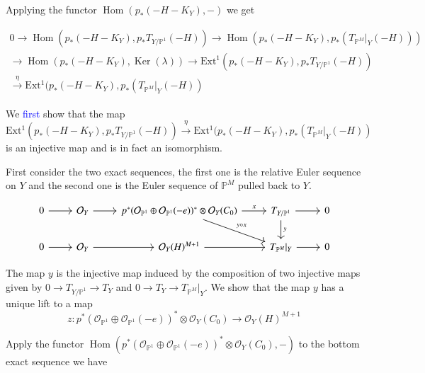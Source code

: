 \documentclass[11pt,twoside]{amsart}
\theoremstyle{plain}
\numberwithin{equation}{section}
\theoremstyle{definition}
\begin{document}
Applying the functor $\operatorname{Hom}(p_*(-H-K_Y),-)$ we get 

\begin{multline}\label{30}
0 \to \operatorname{Hom}(p_*(-H-K_Y), 
 p_*T_{Y/\mathbb{P}^1}(-H))  \to \operatorname{Hom}(p_*(-H-K_Y), p_*(T_{\mathbb{P}^M}|_Y(-H))) \\ \to \operatorname{Hom}(p_*(-H-K_Y),\operatorname{Ker}(\lambda)) \to \operatorname{Ext^1}(p_*(-H-K_Y), 
 p_*T_{Y/\mathbb{P}^1}(-H)) \\ \xrightarrow[]{\eta} \operatorname{Ext^1}(p_*(-H-K_Y), 
 p_*(T_{\mathbb{P}^M}|_Y(-H))
\end{multline}


We \textcolor{blue}{first} show that the map $\operatorname{Ext^1}(p_*(-H-K_Y), 
 p_*T_{Y/\mathbb{P}^1}(-H))  \xrightarrow[]{\eta} \operatorname{Ext^1}(p_*(-H-K_Y), 
 p_*(T_{\mathbb{P}^M}|_Y(-H))$ is an injective map and is in fact an isomorphism. 

\color{blue}

First consider the two exact sequences, the first one is the relative Euler sequence on $Y$ and the second one is the Euler sequence of $\mathbb{P}^M$ pulled back to $Y$.

\[
\begin{tikzcd}
  0 \arrow[r] & \mathcal{O}_Y \arrow[r] & p^*(\mathcal{O}_{\mathbb{P}^1} \oplus \mathcal{O}_{\mathbb{P}^1}(-e))^* \otimes \mathcal{O}_{Y}(C_0) \arrow[r, "x"] \arrow[dr, "y \circ x"] & T_{Y/\mathbb{P}^1} \arrow[r] \arrow[d, "y"] & 0 \\
   0 \arrow[r] & \mathcal{O}_Y \arrow[r] & \mathcal{O}_Y(H)^{M+1} \arrow[r] & T_{\mathbb{P}^M}|_Y \arrow[r] & 0
\end{tikzcd}
\]

The map $y$ is the injective map induced by the composition of two injective maps given by $0 \to T_{Y/\mathbb{P}^1} \to T_Y$ and $0 \to T_Y \to T_{\mathbb{P}^M}|_Y$. We show that the map $y$ has a unique lift to a map $$z: p^*(\mathcal{O}_{\mathbb{P}^1} \oplus \mathcal{O}_{\mathbb{P}^1}(-e))^* \otimes \mathcal{O}_Y(C_0) \to \mathcal{O}_Y(H)^{M+1}$$

Apply the functor $\operatorname{Hom}(p^*(\mathcal{O}_{\mathbb{P}^1} \oplus \mathcal{O}_{\mathbb{P}^1}(-e))^* \otimes \mathcal{O}_Y(C_0), -)$ to the bottom exact sequence we have 
\end{document}

